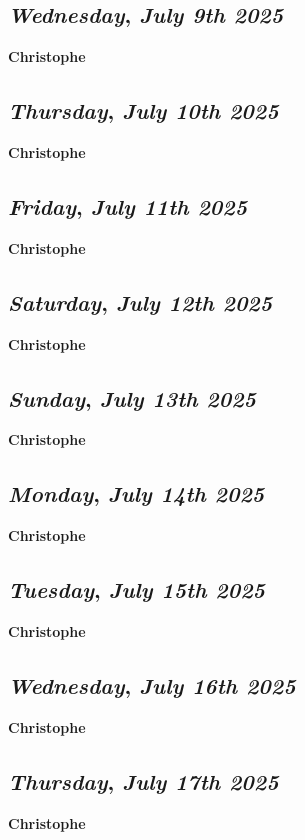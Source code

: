 \def\day{\textit{July 9th 2025}}
\def\weekday{\textit{Wednesday}}
\subsection*{\weekday, \day}
\textbf {Christophe}

\def\day{\textit{July 10th 2025}}
\def\weekday{\textit{Thursday}}
\subsection*{\weekday, \day}
\textbf {Christophe}

\def\day{\textit{July 11th 2025}}
\def\weekday{\textit{Friday}}
\subsection*{\weekday, \day}
\textbf {Christophe}

\def\day{\textit{July 12th 2025}}
\def\weekday{\textit{Saturday}}
\subsection*{\weekday, \day}
\textbf {Christophe}

\def\day{\textit{July 13th 2025}}
\def\weekday{\textit{Sunday}}
\subsection*{\weekday, \day}
\textbf {Christophe}

\def\day{\textit{July 14th 2025}}
\def\weekday{\textit{Monday}}
\subsection*{\weekday, \day}
\textbf {Christophe}

\def\day{\textit{July 15th 2025}}
\def\weekday{\textit{Tuesday}}
\subsection*{\weekday, \day}
\textbf {Christophe}

\def\day{\textit{July 16th 2025}}
\def\weekday{\textit{Wednesday}}
\subsection*{\weekday, \day}
\textbf {Christophe}

\def\day{\textit{July 17th 2025}}
\def\weekday{\textit{Thursday}}
\subsection*{\weekday, \day}
\textbf {Christophe}

